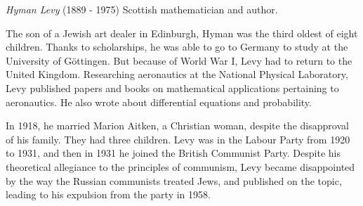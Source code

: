 \documentclass[12pt]{article}
\begin{document}

\emph{Hyman Levy} (1889 - 1975) Scottish mathematician and author.

The son of a Jewish art dealer in Edinburgh, Hyman was the third oldest of eight children. Thanks to scholarships, he was able to go to Germany to study at the University of G\"ottingen. But because of World War I, Levy had to return to the United Kingdom. Researching aeronautics at the National Physical Laboratory, Levy published papers and books on mathematical applications pertaining to aeronautics. He also wrote about differential equations and probability. 

In 1918, he married Marion Aitken, a Christian woman, despite the disapproval of his family. They had three children. Levy was in the Labour Party from 1920 to 1931, and then in 1931 he joined the British Communist Party. Despite his theoretical allegiance to the principles of communism, Levy became disappointed by the way the Russian communists treated Jews, and published on the topic, leading to his expulsion from the party in 1958.
\end{document}
